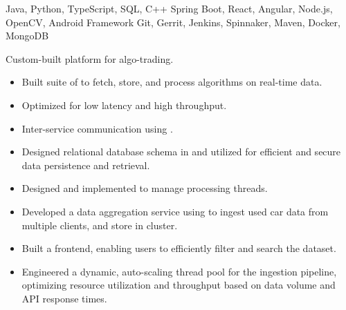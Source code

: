  Java, Python, TypeScript, SQL, C++\newline
{} Spring Boot, React, Angular, Node.js, OpenCV, Android Framework\newline
{} Git, Gerrit, Jenkins, Spinnaker, Maven, Docker, MongoDB\newline


Custom-built platform for algo-trading.
\begin{itemize}
  \item Built  suite of   to fetch, store, and process algorithms on real-time  data.
  \item Optimized for low latency and high throughput.
  \item Inter-service communication using .
  \item Designed relational database schema in  and utilized  for efficient and secure data persistence and retrieval.
  \item Designed and implemented  to manage processing threads.
 \end{itemize}

\begin{itemize}
    \item Developed a data aggregation service using  to ingest used car data from multiple clients, and store in  cluster.
    \item Built a  frontend, enabling users to efficiently filter and search the dataset.
    \item Engineered a dynamic, auto-scaling thread pool for the ingestion pipeline, optimizing resource utilization and throughput based on data volume and API response times.
 \end{itemize}
 
